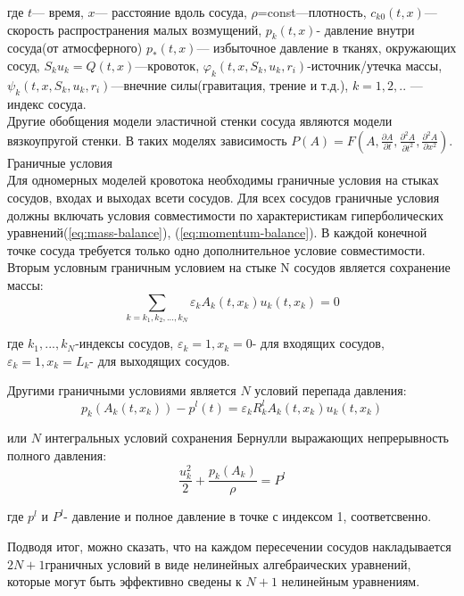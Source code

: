где $t$— время, $x$— расстояние вдоль сосуда, $\rho$=const—плотность, $c_{k0}(t,x)$— скорость распространения малых возмущений,  $p_k(t,x)$- давление внутри сосуда(от атмосферного) $p_*(t,x)$— избыточное давление в тканях, окружающих сосуд, $S_ku_k=Q(t,x)$—кровоток, $\varphi _k(t,x,S_k,u_k,r_i)$-источник/утечка массы, $\psi_k(t,x,S_k,u_k,r_i)$—внечние силы(гравитация, трение и т.д.), $k=1,2,..$ —индекс сосуда.
\\ 
Другие обобщения модели эластичной стенки сосуда являются модели вязкоупругой стенки. В таких моделях зависимость 
$
P(A)=F\left(A,\frac{\partial A}{ \partial t},\frac{\partial^2A }{\partial t^2},\frac{\partial^2A}{\partial x^2}\right)
$.\\

{Граничные условия}\\
Для одномерных моделей кровотока необходимы граничные условия на стыках сосудов, входах и выходах всети сосудов. Для всех сосудов граничные условия должны включать условия совместимости по характеристикам гиперболических уравнений(\ref{eq:mass-balance}), (\ref{eq:momentum-balance}).
В каждой конечной точке сосуда требуется только одно дополнительное условие совместимости.
Вторым условным граничным условием на стыке N сосудов является сохранение массы:
\begin{equation}
    \label{eq:conserv-mass}
    \sum_{k=k_1,k_2,...,k_N} \varepsilon_k A_k(t,x_k)u_k(t,x_k)=0
\end{equation}

где {$k_1,...,k_N$}-индексы сосудов, $\varepsilon_k=1, x_k=0$- для входящих сосудов,$\varepsilon_k=1, x_k=L_k$- для выходящих сосудов.

Другими граничными условиями является $N$ условий перепада давления:
\begin{equation}
    \label{eq:p-pressure}
    p_k(A_k(t,x_k))-p^l(t)=\varepsilon_k R^l_k A_k(t,x_k)u_k(t,x_k)
\end{equation}

или $N$ интегральных условий сохранения Бернулли выражающих непрерывность полного давления:
\begin{equation}
    \label{eq:bernulli}
    \frac{u^2_k}{2}+\frac{p_k(A_k)}{\rho}=P^l
\end{equation}

где $p^l$ и $P^l$- давление и полное давление в точке с индексом 1, соответсвенно.

Подводя итог, можно сказать, что на каждом пересечении сосудов накладывается $2N + 1 $граничных условий в виде нелинейных алгебраических уравнений, которые могут быть 
эффективно сведены к $N + 1$ нелинейным уравнениям.

